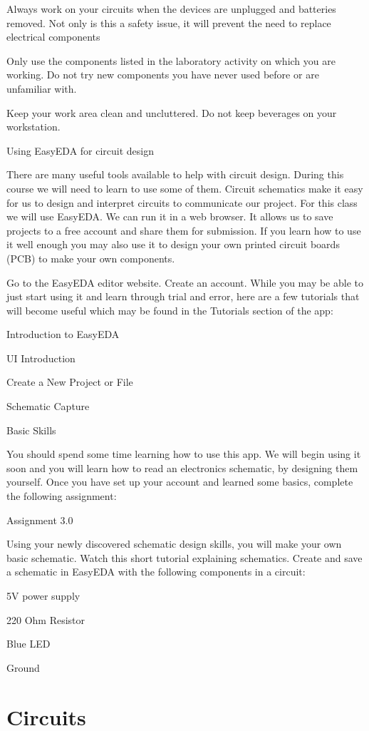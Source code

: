 \documentclass[
]{book}
\begin{document}
Always work on your circuits when the devices are unplugged and batteries removed. Not only is this a safety issue, it will prevent the need to replace electrical components

Only use the components listed in the laboratory activity on which you are working. Do not try new components you have never used before or are unfamiliar with.

Keep your work area clean and uncluttered. Do not keep beverages on your workstation.

Using EasyEDA for circuit design

There are many useful tools available to help with circuit design. During this course we will need to learn to use some of them. Circuit schematics make it easy for us to design and interpret circuits to communicate our project. For this class we will use EasyEDA. We can run it in a web browser. It allows us to save projects to a free account and share them for submission. If you learn how to use it well enough you may also use it to design your own printed circuit boards (PCB) to make your own components.

Go to the EasyEDA editor website. Create an account. While you may be able to just start using it and learn through trial and error, here are a few tutorials that will become useful which may be found in the Tutorials section of the app:

Introduction to EasyEDA

UI Introduction

Create a New Project or File

Schematic Capture

Basic Skills

You should spend some time learning how to use this app. We will begin using it soon and you will learn how to read an electronics schematic, by designing them yourself. Once you have set up your account and learned some basics, complete the following assignment:

Assignment 3.0

Using your newly discovered schematic design skills, you will make your own basic schematic. Watch this short tutorial explaining schematics. Create and save a schematic in EasyEDA with the following components in a circuit:

5V power supply

220 Ohm Resistor

Blue LED

Ground

\hypertarget{circuits}{%
\section{Circuits}\label{circuits}}
\end{document}
